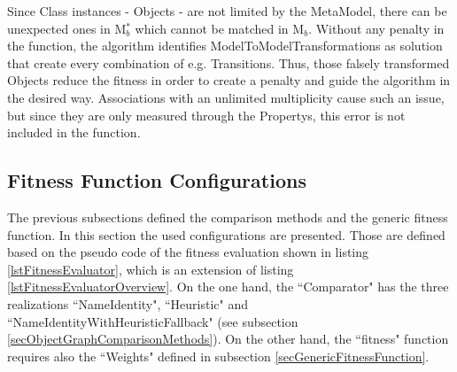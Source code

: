 Since \gls{Class} instances - \glspl{Object} - are not limited by the \gls{MetaModel}, there can be unexpected ones in M$_b^*$ which cannot be matched in M$_b$. Without any penalty in the function, the algorithm identifies \glspl{ModelToModelTransformation} as solution that create every combination of e.g. Transitions. Thus, those falsely transformed \glspl{Object} reduce the fitness in order to create a penalty and guide the algorithm in the desired way. \Glspl{Association} with an unlimited multiplicity cause such an issue, but since they are only measured through the \glspl{Property}, this error is not included in the function. %


\subsection{Fitness Function Configurations}
\label{secFitnessFunctionConfigurations}

The previous subsections defined the comparison methods and the generic fitness function. In this section the used configurations are presented. Those are defined based on the pseudo code of the fitness evaluation shown in listing \ref{lstFitnessEvaluator}, which is an extension of listing \ref{lstFitnessEvaluatorOverview}. On the one hand, the ``Comparator" has the three realizations ``NameIdentity", ``Heuristic" and ``NameIdentityWithHeuristicFallback" (see subsection \ref{secObjectGraphComparisonMethods}). On the other hand, the ``fitness" function requires also the ``Weights" defined in subsection \ref{secGenericFitnessFunction}.

